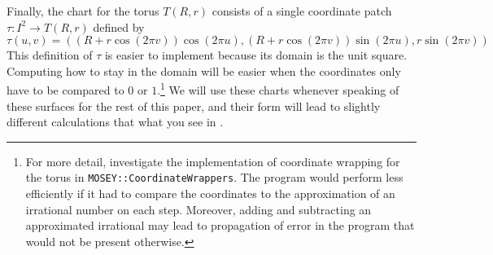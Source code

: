 \documentclass[12pt]{article}
\begin{document}
		Finally, the chart for the torus $T(R,r)$ consists of a single coordinate patch $\tau:I^2 \to T(R,r)$ defined by
		$$ \tau(u,v) = ( (R+r\cos(2\pi v))\cos(2\pi u) , (R+r\cos(2\pi v))\sin(2\pi u) , r\sin(2\pi v) ) $$
		This definition of $\tau$ is easier to implement because its domain is the unit square.
		Computing how to stay in the domain will be easier when the coordinates only have to be compared to $0$ or $1$.\footnote{
			For more detail, investigate the implementation of coordinate wrapping for the torus in \texttt{MOSEY::CoordinateWrappers}. The program would perform less efficiently if it had to compare the coordinates to the approximation of an irrational number on each step.
			Moreover, adding and subtracting an approximated irrational may lead to propagation of error in the program that would not be present otherwise.
			}
		We will use these charts whenever speaking of these surfaces for the rest of this paper, and their form will lead to slightly different calculations that what you see in \cite{BanchoffLovett_DiffGeo_2010,Irons_GeodesicsTorus_2005}.
		
\end{document}
